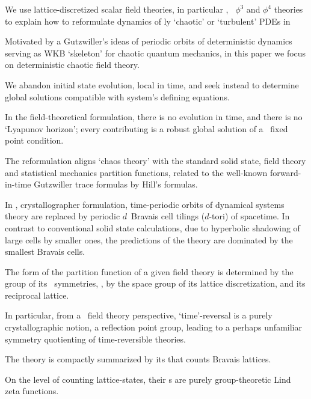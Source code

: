 

We use lattice-discretized
scalar field theories, in particular \catlatt, \Henon\
{$\phi^3$} and {$\phi^4$} theories
to explain how to reformulate dynamics of {\spt}ly `chaotic' or
`turbulent' PDEs in

Motivated by a Gutzwiller's ideas of periodic orbits of
deterministic dynamics serving as WKB
`skeleton' for chaotic quantum mechanics, in this paper we
focus on deterministic chaotic field theory.

We abandon initial state evolution, local in time, and seek instead to
determine global solutions compatible with system's defining equations.

In the field-theoretical formulation, there is no evolution in time, and
there is no `Lyapunov horizon'; every contributing {\em \lattstate} is a
robust global solution of a \spt\ fixed point condition.

The reformulation aligns `chaos theory' with the standard solid state,
field theory and statistical mechanics partition functions, related to
the well-known for\-ward-in-time Gutzwiller trace formulas by Hill's
formulas.

In \spt, crystallographer formulation, time-periodic orbits of
dynamical systems theory are replaced by periodic $d$\dmn\ {Bravais cell}
tilings ($d$-tori) of spacetime. In contrast to conventional
solid state calculations, due to hyperbolic shadowing of large
cells by smaller ones, the predictions of the theory are dominated by
the smallest Bravais cells.


The form of the partition function of a
given field theory is determined by the group of its \spt\ symmetries, \ie,
by the space group of its lattice discretization,  and its reciprocal
lattice.

In particular, from a \spt\ field theory perspective, `time'-reversal is
a purely crystallographic notion, a reflection point group, leading to a
perhaps unfamiliar symmetry quotienting of time-reversible theories.

The theory is compactly summarized by its {\tzeta}
that counts Bravais lattices.

On the level of counting lattice-states, their {\tzeta}s are purely
group-theoretic Lind zeta functions.
